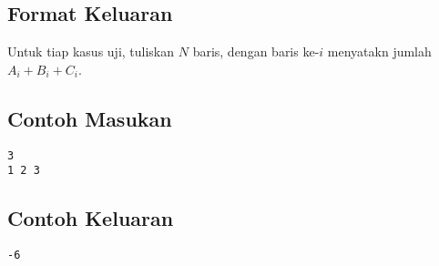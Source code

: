 \documentclass{article}
\begin{document}
\subsection*{Format Keluaran}

Untuk tiap kasus uji, tuliskan $N$ baris, dengan baris ke-$i$ menyatakn jumlah $A_i + B_i + C_i$.
\\

\begin{multicols}{2}
\subsection*{Contoh Masukan}
\begin{lstlisting}
3
1 2 3
\end{lstlisting}
\columnbreak
\subsection*{Contoh Keluaran}
\begin{lstlisting}
-6
\end{lstlisting}
\vfill
\null
\end{multicols}


\pagebreak
\end{document}
